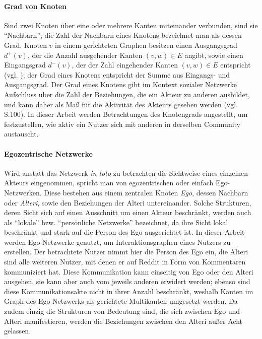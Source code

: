 \documentclass[11pt,a4paper,twoside]{article}
\let\oldpar\paragraph
\renewcommand{\paragraph}{\oldpar*}
\begin{document}
\hypertarget{grad-von-knoten}{%
\paragraph{Grad von Knoten}\label{grad-von-knoten}}

Sind zwei Knoten über eine oder mehrere Kanten miteinander verbunden,
sind sie \enquote{Nachbarn}; die Zahl der Nachbarn eines Knotens
bezeichnet man als dessen Grad. Knoten \(v\) in einem gerichteten
Graphen besitzen einen Ausgangsgrad \(d^{+}(v)\), der die Anzahl
ausgehender Kanten \((v,w) \in E\) angibt, sowie einen Eingangsgrad
\(d^{-}(v)\), der der Zahl eingehender Kanten \((v,w) \in E\) entspricht
(vgl. \autocite{Brandes2012}); der Grad eines Knotens entspricht der
Summe aus Eingangs- und Ausgangsgrad. Der Grad eines Knotens gibt im
Kontext sozialer Netzwerke Aufschluss über die Zahl der Beziehungen, die
ein Akteur zu anderen ausbildet, und kann daher als Maß für die
Aktivität des Akteurs gesehen werden (vgl. \autocite{Wasserman1994}
S.100). In dieser Arbeit werden Betrachtungen des Knotengrads
angestellt, um festzustellen, wie aktiv ein Nutzer sich mit anderen in
derselben Community austauscht.

\hypertarget{egozentrische-netzwerke}{%
\paragraph{Egozentrische Netzwerke}\label{egozentrische-netzwerke}}

Wird anstatt das Netzwerk \emph{in toto} zu betrachten die Sichtweise
eines einzelnen Akteurs eingenommen, spricht man von egozentrischen oder
einfach Ego-Netzwerken. Diese bestehen aus einem zentralen Knoten
\emph{Ego}, dessen Nachbarn oder \emph{Alteri}, sowie den Beziehungen
der Alteri untereinander. Solche Strukturen, deren Sicht sich auf einen
Ausschnitt um einen Akteur beschränkt, werden auch als \enquote{lokale}
bzw. \enquote{persönliche Netzwerke} bezeichnet, da ihre Sicht lokal
beschränkt und stark auf die Person des Ego ausgerichtet ist. In dieser
Arbeit werden Ego-Netzwerke genutzt, um Interaktionsgraphen eines
Nutzers zu erstellen. Der betrachtete Nutzer nimmt hier die Person des
Ego ein, die Alteri sind alle weiteren Nutzer, mit denen er auf Reddit
in Form von Kommentaren kommuniziert hat. Diese Kommunikation kann
einseitig von Ego oder den Alteri ausgehen, sie kann aber auch vom
jeweils anderen erwidert werden; ebenso sind diese Kommunikationsakte
nicht in ihrer Anzahl beschränkt, weshalb Kanten im Graph des
Ego-Netzwerks als gerichtete Multikanten umgesetzt werden. Da zudem
einzig die Strukturen von Bedeutung sind, die sich zwischen Ego und
Alteri manifestieren, werden die Beziehungen zwischen den Alteri außer
Acht gelassen.
\end{document}
